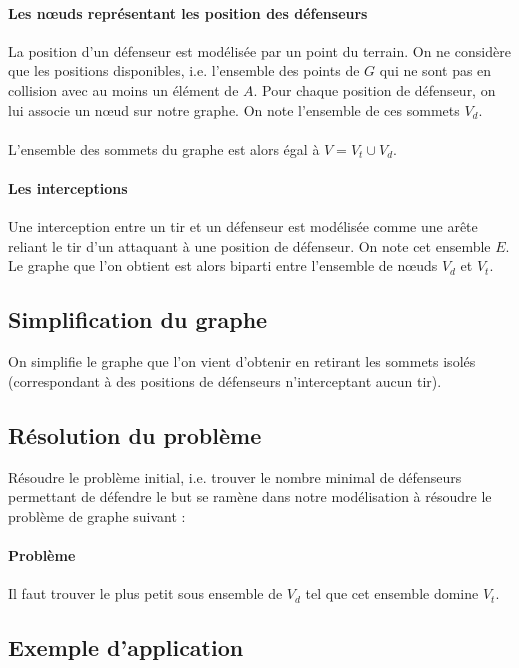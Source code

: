 \documentclass[12pt]{article}
\begin{document}
\paragraph{Les n\oe uds représentant les position des défenseurs}
La position d'un défenseur est modélisée par un point du terrain. On ne considère que les positions disponibles, i.e. l'ensemble des points de $G$ qui ne sont pas en collision avec au moins un élément de $A$. Pour chaque position de défenseur, on lui associe un n\oe ud sur notre graphe. On note l'ensemble de ces sommets $V_d$.

\paragraph{} L'ensemble des sommets du graphe est alors égal à $V = V_t \cup V_d$.

\paragraph{Les interceptions}
Une interception entre un tir et un défenseur est modélisée comme une arête reliant le tir d'un attaquant à une position de défenseur. On note cet ensemble $E$. Le graphe que l'on obtient est alors biparti entre l'ensemble de n\oe uds $V_d$ et $V_t$.

\subsection{Simplification du graphe}
On simplifie le graphe que l'on vient d'obtenir en retirant les sommets isolés (correspondant à des positions de défenseurs n'interceptant aucun tir).

\subsection{Résolution du problème}
Résoudre le problème initial, i.e. trouver le nombre minimal de défenseurs permettant de défendre le but se ramène dans notre modélisation à résoudre le problème de graphe suivant :

\paragraph{Problème} \textcolor{problem}{Il faut trouver le plus petit sous ensemble de $V_d$ tel que cet ensemble domine $V_t$.}

\subsection{Exemple d'application}
\end{document}
